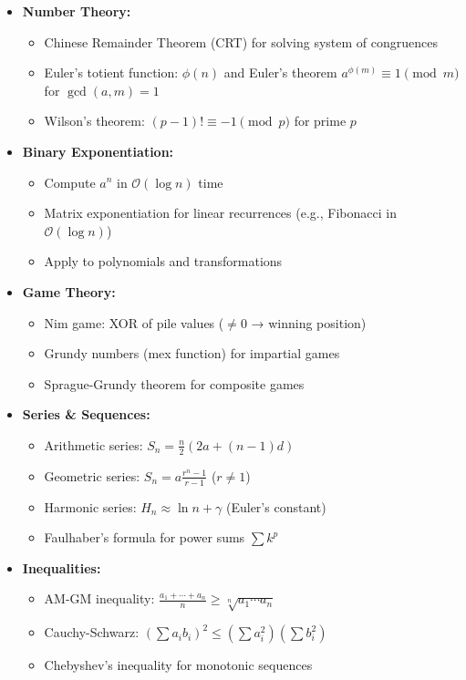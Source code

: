 \documentclass[a4paper,10pt]{book}
\begin{document}
\begin{itemize}
    \item \textbf{Number Theory:}
    \begin{itemize}
        \item Chinese Remainder Theorem (CRT) for solving system of congruences
        \item Euler's totient function: $\phi(n)$ and Euler's theorem $a^{\phi(m)} \equiv 1 \pmod{m}$ for $\gcd(a,m)=1$
        \item Wilson's theorem: $(p-1)! \equiv -1 \pmod{p}$ for prime $p$
    \end{itemize}
    
    \item \textbf{Binary Exponentiation:}
    \begin{itemize}
        \item Compute $a^n$ in $\mathcal{O}(\log n)$ time
        \item Matrix exponentiation for linear recurrences (e.g., Fibonacci in $\mathcal{O}(\log n)$)
        \item Apply to polynomials and transformations
    \end{itemize}
    
    \item \textbf{Game Theory:}
    \begin{itemize}
        \item Nim game: XOR of pile values ($\neq 0$ → winning position)
        \item Grundy numbers (mex function) for impartial games
        \item Sprague-Grundy theorem for composite games
    \end{itemize}
    
    \item \textbf{Series \& Sequences:}
    \begin{itemize}
        \item Arithmetic series: $S_n = \frac{n}{2}(2a + (n-1)d)$
        \item Geometric series: $S_n = a\frac{r^n-1}{r-1}$ ($r \neq 1$)
        \item Harmonic series: $H_n \approx \ln n + \gamma$ (Euler's constant)
        \item Faulhaber's formula for power sums $\sum k^p$
    \end{itemize}
    
    \item \textbf{Inequalities:}
    \begin{itemize}
        \item AM-GM inequality: $\frac{a_1+\cdots+a_n}{n} \geq \sqrt[n]{a_1 \cdots a_n}$
        \item Cauchy-Schwarz: $(\sum a_i b_i)^2 \leq (\sum a_i^2)(\sum b_i^2)$
        \item Chebyshev's inequality for monotonic sequences
    \end{itemize}
    

\end{itemize}
\end{document}
